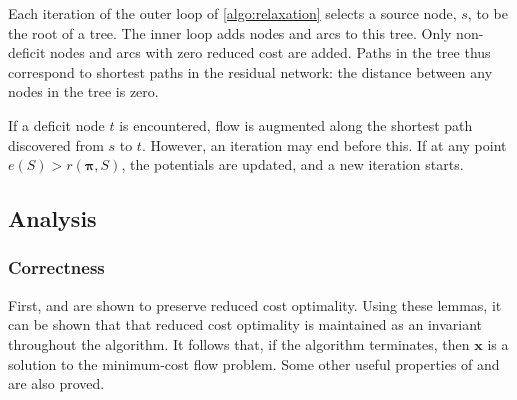 Each iteration of the outer loop of \cref{algo:relaxation} selects a source node, $s$, to be the root of a tree. The inner loop adds nodes and arcs to this tree. Only non-deficit nodes and arcs with zero reduced cost are added. Paths in the tree thus correspond to shortest paths in the residual network: the distance between any nodes in the tree is zero\footnotemark.

If a deficit node $t$ is encountered, flow is augmented along the shortest path discovered from $s$ to $t$. However, an iteration may end before this. If at any point $e(S) > r(\boldsymbol{\pi},S)$, the potentials are updated, and a new iteration starts\footnotemark.

\subsection{Analysis} \label{sec:impl-relax-analysis}

\subsubsection{Correctness}

First,  and  are shown to preserve reduced cost optimality. Using these lemmas, it can be shown that that reduced cost optimality is maintained as an invariant throughout the algorithm. It follows that, if the algorithm terminates, then $\mathbf{x}$ is a solution to the minimum-cost flow problem. Some other useful properties of  and  are also proved.\\

